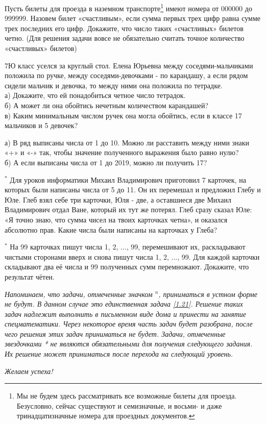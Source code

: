 \begin{thm}
	Пусть билеты для проезда в наземном транспорте\footnote{Мы не будем здесь рассматривать все возможные билеты для проезда. Безусловно, сейчас существуют и семизначные, и восьми- и даже тринадцатизначные номера для проездных документов.}  имеют номера от 000000 до 999999. Назовем билет «счастливым», если сумма первых трех цифр равна сумме трех последних его цифр. Докажите, что число таких «счастливых» билетов четно. (Для решения задачи вовсе не обязательно считать точное количество «счастливых» билетов)
\end{thm}

\begin{thm}
	7Ю класс уселся за круглый стол. Елена Юрьевна между соседями-мальчиками положила по ручке, между соседями-девочками - по карандашу, а если рядом сидели мальчик и девочка, то между ними она положила по тетрадке.\\
	а) Докажите, что ей понадобиться четное число тетрадок.\\
	б) А может ли она обойтись нечетным количеством карандашей?\\
	в) Каким минимальным числом ручек она могла обойтись, если в классе 17 мальчиков и 5 девочек?
\end{thm}

\begin{thm}\label{an1.3}
	а) В ряд выписаны числа от 1 до 10. Можно ли расставить между ними знаки «+» и «-» так, чтобы значение полученного выражения было равно нулю?\\ б) А если выписаны числа от 1 до 2019, можно ли получить 17?
\end{thm}

\begin{thm}$^\ast$
	Для уроков информатики Михаил Владимирович приготовил 7 карточек, на которых были написаны числа от 5 до 11. Он их перемешал и предложил Глебу и Юле. Глеб взял себе три карточки, Юля - две, а оставшиеся две Михаил Владимирович отдал Ване, который их тут же потерял. Глеб сразу сказал Юле: «Я точно знаю, что сумма чисел на твоих карточках четна», и оказался абсолютно прав. Какие числа были написаны на карточках у Глеба?
\end{thm}

\begin{thm}$^\ast$ На 99 карточках пишут числа 1, 2, ..., 99, перемешивают их, раскладывают чистыми сторонами вверх и снова пишут числа 1, 2, ..., 99. Для каждой карточки складывают два её числа и 99 полученных сумм перемножают. Докажите, что результат чётен.
\end{thm}
\textit{ Напоминаем, что задачи, отмеченные значком ${}^{ n}$, приниматься в устном форме не будут. В данном случае это единственная задача \ref{1.21}. Решение таких задач надлежит выполнить в письменном виде дома и принести на занятие спецматематики. Через некоторое время часть задач будет разобрана, после чего решения этих задач приниматься не будет. Задачи, отмеченные звездочками * не являются обязательными для получения следующего задания. Их решение может приниматься после перехода на следующий уровень.}     
\begin{flushright}
	\textit{Желаем успеха!}
\end{flushright}
\newpage